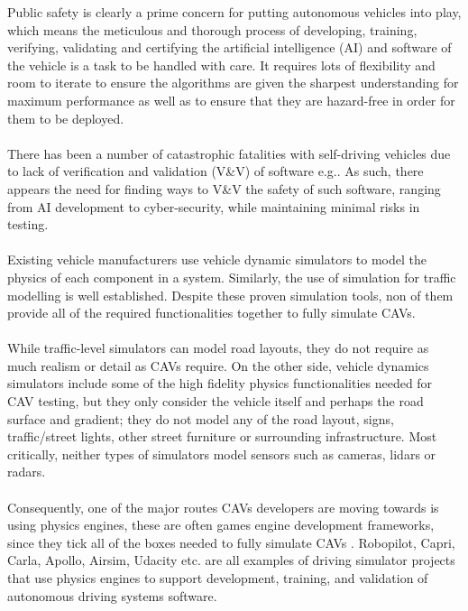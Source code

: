 Public safety is clearly a prime concern for putting autonomous vehicles into play, which means the meticulous and thorough process of developing, training, verifying, validating and certifying the artificial intelligence (AI) and software of the vehicle is a task to be handled with care. 
It requires lots of flexibility and room to iterate to ensure the algorithms are given the sharpest understanding for maximum performance as well as to ensure that they are hazard-free in order for them to be deployed\cite{AirsimUnrealArticle}.\\\\
\noindent There has been a number of catastrophic fatalities with self-driving vehicles due to lack of verification and validation (V\&V) of software e.g.\cite{FatalityExample}.
As such, there appears the need for finding ways to V\&V the safety of such software, ranging from AI development to cyber-security, while maintaining minimal risks in testing.\\\\
\noindent Existing vehicle manufacturers use vehicle dynamic simulators to model the physics of each component in a system. 
Similarly, the use of simulation for traffic modelling is well established. 
Despite these proven simulation tools, non of them provide all of the required functionalities together to fully simulate CAVs\cite{FrameworkAndChallenges}.\\\\
While traffic-level simulators can model road layouts, they do not require as much realism or detail as CAVs require. On the other side, vehicle dynamics simulators include some of the high fidelity physics functionalities needed for CAV testing, but they only consider the vehicle itself and perhaps the road surface and gradient; they do not model any of the road layout, signs, traffic/street lights, other street furniture or surrounding infrastructure. 
Most critically, neither types of simulators model sensors such as cameras, lidars or radars\cite{FrameworkAndChallenges}.\\\\ 
Consequently, one of the major routes CAVs developers are moving towards is using physics engines, these are often games engine development frameworks, since they tick all of the boxes needed to fully simulate CAVs \cite{FrameworkAndChallenges}.  
Robopilot, Capri, Carla, Apollo, Airsim, Udacity etc. are all examples of driving simulator projects that use physics engines to support development, training, and validation of autonomous driving systems software\cite{ListOfSimulators}. \\\\
